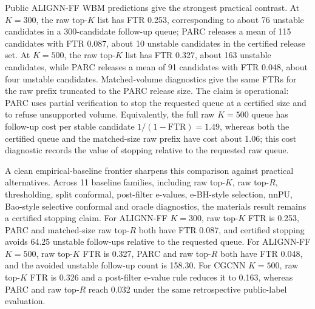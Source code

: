 \documentclass[10pt,twocolumn]{article}
\begin{document}
Public ALIGNN-FF WBM predictions give the strongest practical contrast.
At \(K=300\), the raw top-\(K\) list has FTR 0.253, corresponding to about 76 unstable candidates in a 300-candidate follow-up queue; PARC releases a mean of 115 candidates with FTR 0.087, about 10 unstable candidates in the certified release set.
At \(K=500\), the raw top-\(K\) list has FTR 0.327, about 163 unstable candidates, while PARC releases a mean of 91 candidates with FTR 0.048, about four unstable candidates.
Matched-volume diagnostics give the same FTRs for the raw prefix truncated to the PARC release size.
The claim is operational: PARC uses partial verification to stop the requested queue at a certified size and to refuse unsupported volume.
Equivalently, the full raw \(K=500\) queue has follow-up cost per stable candidate \(1/(1-\mathrm{FTR})=1.49\), whereas both the certified queue and the matched-size raw prefix have cost about 1.06; this cost diagnostic records the value of stopping relative to the requested raw queue.

A clean empirical-baseline frontier sharpens this comparison against practical alternatives.
Across 11 baseline families, including raw top-\(K\), raw top-\(R\), thresholding, split conformal, post-filter e-values, e-BH-style selection, nnPU, Bao-style selective conformal and oracle diagnostics, the materials result remains a certified stopping claim.
For ALIGNN-FF \(K=300\), raw top-\(K\) FTR is 0.253, PARC and matched-size raw top-\(R\) both have FTR 0.087, and certified stopping avoids 64.25 unstable follow-ups relative to the requested queue.
For ALIGNN-FF \(K=500\), raw top-\(K\) FTR is 0.327, PARC and raw top-\(R\) both have FTR 0.048, and the avoided unstable follow-up count is 158.30.
For CGCNN \(K=500\), raw top-\(K\) FTR is 0.326 and a post-filter e-value rule reduces it to 0.163, whereas PARC and raw top-\(R\) reach 0.032 under the same retrospective public-label evaluation.
\end{document}
